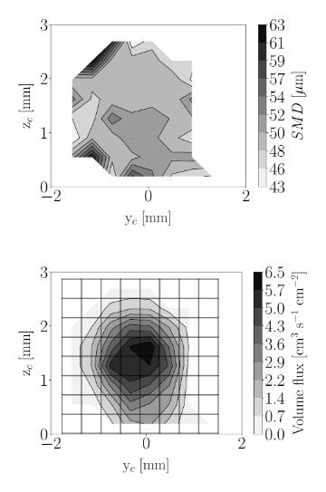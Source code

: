 \begin{figure}[h!]
\centering
\begin{subfigure}[b]{0.3\textwidth}
	\centering
   \includegraphics[scale=\scaleSLIBIMER]{./part3_applications/figures_ch8_resolved/injectors_SLI/dx15_xD06p67_SMD_map}
\end{subfigure}
   \hspace{0.17in}
\begin{subfigure}[b]{0.3\textwidth}
	\centering
   \includegraphics[scale=\scaleSLIBIMER]{./part3_applications/figures_ch8_resolved/injectors_SLI/dx15_xD06p67_volume_flux_map}
\end{subfigure}

\end{figure}
